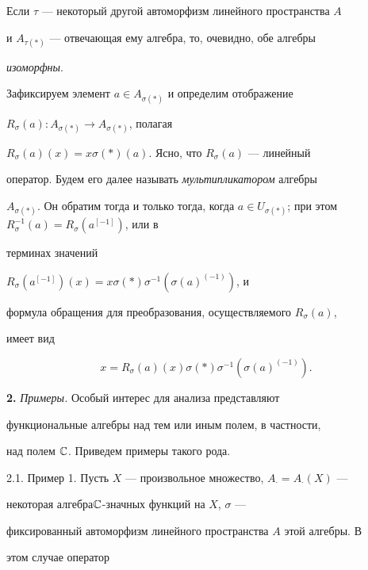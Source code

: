  


Если $\tau$ --- некоторый другой автоморфизм линейного пространства $A$ 


и $A_{\tau(*)}$ --- отвечающая ему алгебра, то, очевидно, обе алгебры 


{\it изоморфны}. 


 


Зафиксируем элемент $a\in A_{\sigma(*)}$ и определим отображение 


$R_\sigma(a):A_{\sigma(*)}\to A_{\sigma(*)}$, полагая 


$R_\sigma(a)(x)=x\sigma(*)(a)$. Ясно, что $R_\sigma(a)$ --- линейный 


оператор. Будем его далее называть {\it мультипликатором} алгебры 


$A_{\sigma(*)}$. Он обратим тогда и только тогда, когда $a\in 


U_{\sigma(*)}$; при этом $R^{-1}_\sigma(a)=R_\sigma(a^{[-1]})$, или в 


терминах значений 


$R_\sigma(a^{[-1]})(x)=x\sigma(*)\sigma^{-1}(\sigma(a)^{(-1)})$, и 


формула обращения для преобразования, осуществляемого $R_\sigma(a)$, 


имеет вид 


$$ 


x=R_\sigma(a)(x)\sigma(*)\sigma^{-1}(\sigma(a)^{(-1)}). 


$$ 


 


{\bf 2.} {\it Примеры.} Особый интерес для анализа представляют 


функциональные алгебры над тем или иным полем, в частности, 


над полем $\Bbb C$. Приведем примеры такого рода. 


\medskip 


 


 


2.1. Пример 1. Пусть $X$ --- произвольное множество, $A_\cdot=A_\cdot(X)$ --- 


некоторая алгебра\linebreak $\Bbb C$-значных функций на $X$, $\sigma$ --- 


фиксированный автоморфизм линейного пространства $A$ этой алгебры. В 


этом случае оператор 


